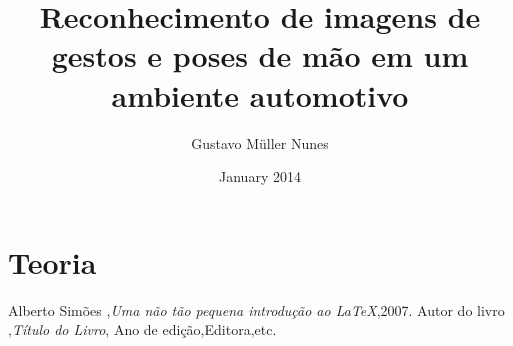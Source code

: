 \documentclass[a4paper,11pt,oneside]{book}
\begin{document}
\author{Gustavo Müller Nunes}
\title{Reconhecimento de imagens de gestos e poses de mão em um ambiente automotivo}
\date{January 2014}

\maketitle
\tableofcontents 	%
\listoftables 		%
\listoffigures 		%



\chapter{Teoria}



\begin{thebibliography}{2}
 
 Alberto Simões ,{\em Uma não tão pequena introdução ao \LaTeX},2007.
 Autor do livro ,{\em Título do Livro}, Ano de edição,Editora,etc.
 
\end{thebibliography}
\end{document}
